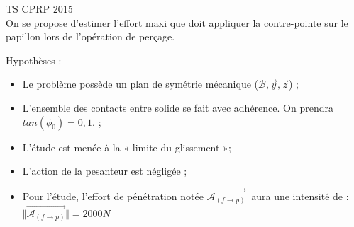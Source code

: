 \documentclass[
	11pt, %
	fleqn, %
	a4paper, %
]{LegrandOrangeBook}
\begin{document}
\begin{Extrait}
TS CPRP 2015 \\
On se propose d’estimer l’effort maxi que doit appliquer la contre-pointe sur le papillon lors de l’opération de perçage. \\



\noindent \begin{minipage}{0.5\textwidth}
\vspace{1cm}
\label{fig:nature}
\end{minipage}
\hspace{0.05\textwidth}
\begin{minipage}{0.4\textwidth}
Hypothèses : 
\begin{itemize}
\item Le problème possède un plan de
symétrie mécanique ($\mathcal{B}, \Vec{y}, \Vec{z}$) ;
\item L’ensemble des contacts entre
solide se fait avec adhérence. On
prendra $tan(\phi_{0}) = 0,1.$ ;
\item L’étude est menée à la « limite du
glissement »;
\item L'action de la pesanteur est
négligée ;
\item Pour l’étude, l’effort de pénétration notée $\overrightarrow{\mathcal{A}_{(f\rightarrow p)}}\ $ aura une intensité de : \\ $ \Vert \overrightarrow{\mathcal{A}_{(f\rightarrow p)}} \Vert = 2000 N\ $
\end{itemize}

\end{minipage}



\end{Extrait}
\end{document}
